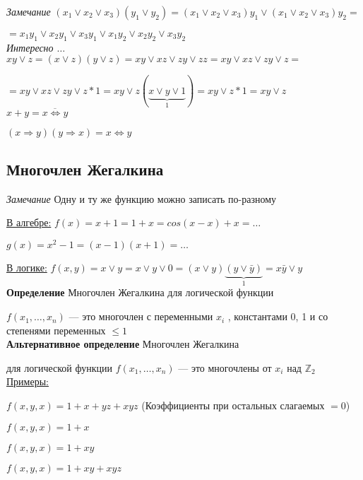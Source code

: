 \documentclass[a4paper, 12pt] {article}
\begin{document}
\textit{Замечание} $ (x_{1} \vee x_{2} \vee x_{3})(y_{1} \vee y_{2}) = (x_{1} \vee x_{2} \vee x_{3})y_{1} \vee (x_{1} \vee x_{2} \vee x_{3})y_{2}= $

$ = x_{1}y_{1} \vee x_{2}y_{1} \vee x_{3}y_{1} \vee x_{1}y_{2} \vee x_{2}y_{2} \vee x_{3}y_{2} $\\

\textit{Интересно $ \dots $} $ x y \vee z = (x \vee z)  (y\vee z) = xy \vee xz \vee zy \vee zz = xy \vee xz \vee zy \vee z =$

$ = xy \vee xz \vee zy \vee z*1 = xy \vee z(\underbrace{x \vee y \vee 1}_1 ) = x y \vee z*1 = x y \vee z $\\

$ x + y = \overline{x \Leftrightarrow y} $

$ (x \Rightarrow y)(y \Rightarrow x) = x \Leftrightarrow y $

\subsection{Многочлен Жегалкина}

\textit{Замечание} Одну и ту же функцию можно записать по-разному

\underline{В алгебре:} $ f(x) = x+1 = 1+x = cos(x-x)+x= \dots $

$ g(x)= x^{2}-1=(x-1)(x+1)= \dots $

\underline{В логике:} $ f(x, y) = x \vee y = x \vee y \vee 0 = (x \vee y)\underbrace{(y \vee \bar y)}_1 = x \bar y \vee y $\\

\textbf{Определение} Многочлен Жегалкина для логической функции 

$ f(x_{1}, \dots , x_{n}) $ --- это многочлен с переменными $ x_{i} $ , константами 0, 1 и со степенями переменных $ \le 1 $\\

\textbf{Альтернативное определение} Многочлен Жегалкина 

для логической функции $ f(x_{1}, \dots , x_{n}) $ --- это многочлены от $ x_{i} $ над $ \mathbb Z_{2} $\\

\underline{Примеры:}

$ f(x, y, x) = 1+x+yz+xyz $ (Коэффициенты при остальных слагаемых $ =0 $)

$ f(x, y, x) = 1+x $ 

$ f(x, y, x) = 1+xy $ 

$ f(x, y, x) = 1+xy+xyz $\\
\end{document}
